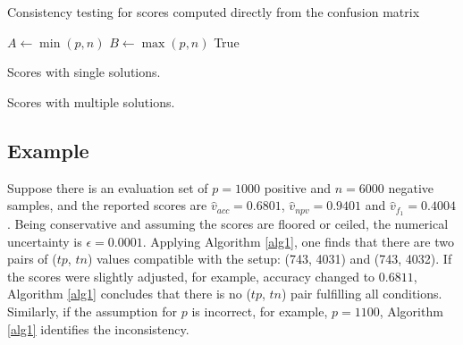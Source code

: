 \documentclass[3p, times]{elsarticle}
\begin{document}

\begin{algorithm}[t]
    \caption{Consistency testing for scores computed directly from the confusion matrix}\label{alg1}
    \begin{small}
    $A \gets \min(p, n)$\;
    $B \gets \max(p, n)$\;
    \Return True\;
    \end{small}
    \end{algorithm}

\begin{table}[t!]
\caption{Scores with single solutions.}
\label{tab2}
\begin{scriptsize}
\begin{center}

\end{center}
\end{scriptsize}
\end{table}

\begin{table}[t!]
\caption{Scores with multiple solutions.}
\label{tab3}
\begin{scriptsize}
\begin{center}

\end{center}
\end{scriptsize}
\end{table}

\subsection{Example}
\label{sec:index}

Suppose there is an evaluation set of $p=1000$ positive and $n=6000$ negative samples, and the reported scores are $\hat{v}_{acc} = 0.6801$, $\hat{v}_{npv} = 0.9401$ and $\hat{v}_{f_1} = 0.4004$. Being conservative and assuming the scores are floored or ceiled, the numerical uncertainty is $\epsilon = 0.0001$. Applying Algorithm \ref{alg1}, one finds that there are two pairs of ($tp$, $tn$) values compatible with the setup: (743, 4031) and (743, 4032). If the scores were slightly adjusted, for example, accuracy changed to $0.6811$, Algorithm \ref{alg1} concludes that there is no ($tp$, $tn$) pair fulfilling all conditions. Similarly, if the assumption for $p$ is incorrect, for example, $p=1100$, Algorithm \ref{alg1} identifies the inconsistency.
\end{document}
